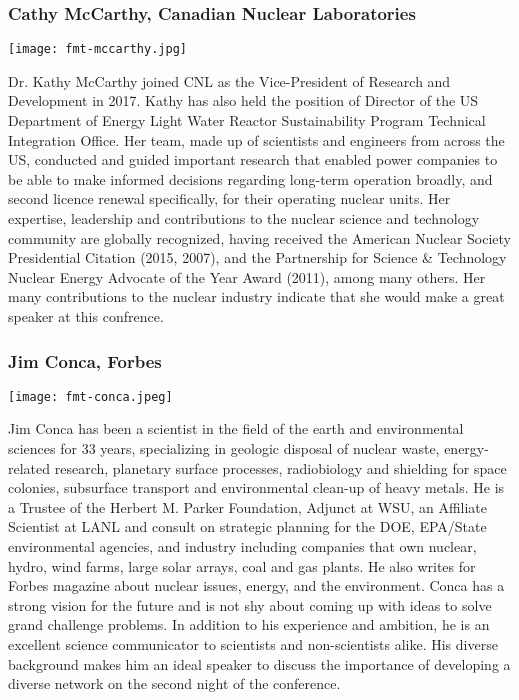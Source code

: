 \subsubsection{Cathy McCarthy, Canadian Nuclear Laboratories}
\begin{minipage}{0.25\textwidth}
	\centering
	\texttt{[image: fmt-mccarthy.jpg]}
\end{minipage}
\begin{minipage}{0.73\textwidth}
	Dr. Kathy McCarthy joined CNL as the Vice-President of Research and Development in 2017. Kathy has also held the position of Director of the US Department of Energy Light Water Reactor Sustainability Program Technical Integration Office. Her team, made up of scientists and engineers from across the US, conducted and guided important research that enabled power companies to be able to make informed decisions regarding long-term operation broadly, and second licence renewal specifically, for their operating nuclear units. Her expertise, leadership and contributions to the nuclear science and technology community are globally recognized, having received the American Nuclear Society Presidential Citation (2015, 2007), and the Partnership for Science \& Technology Nuclear Energy Advocate of the Year Award (2011), among many others. Her many contributions to the nuclear industry indicate that she would make a great speaker at this confrence. 
\end{minipage}


\subsubsection{Jim Conca, Forbes}
\begin{minipage}{0.25\textwidth}
	\centering
	\texttt{[image: fmt-conca.jpeg]}
\end{minipage}
\begin{minipage}{0.73\textwidth}
	Jim Conca has been a scientist in the field of the earth and environmental sciences for 33 years, specializing in geologic disposal of nuclear waste, energy-related research, planetary surface processes, radiobiology and shielding for space colonies, subsurface transport and environmental clean-up of heavy metals. He is a Trustee of the Herbert M. Parker Foundation, Adjunct at WSU, an Affiliate Scientist at LANL and consult on strategic planning for the DOE, EPA/State environmental agencies, and industry including companies that own nuclear, hydro, wind farms, large solar arrays, coal and gas plants. He also writes for Forbes magazine about nuclear issues, energy, and the environment. Conca has a strong vision for the future and is not shy about coming up with ideas to solve grand challenge problems. In addition to his experience and ambition, he is an excellent science communicator to scientists and non-scientists alike. His diverse background makes him an ideal speaker to discuss the importance of developing a diverse network on the second night of the conference.
\end{minipage}


